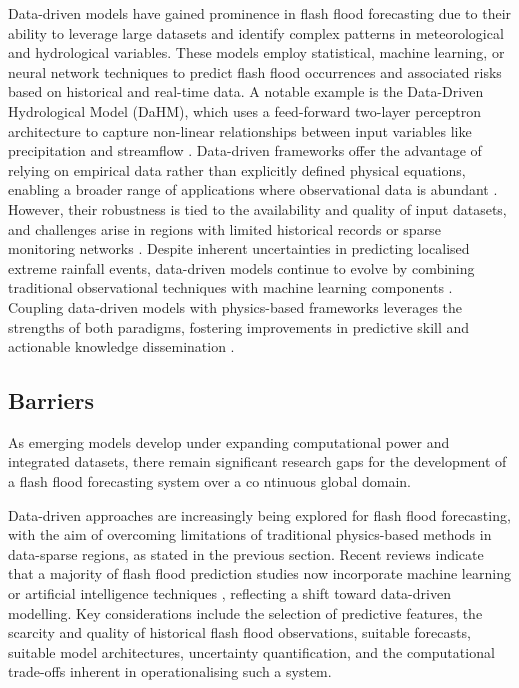 Data-driven models have gained prominence in flash flood forecasting due to their ability to leverage large datasets and identify complex patterns in meteorological and hydrological variables. These models employ statistical, machine learning, or neural network techniques to predict flash flood occurrences and associated risks based on historical and real-time data. A notable example is the Data-Driven Hydrological Model (DaHM), which uses a feed-forward two-layer perceptron architecture to capture non-linear relationships between input variables like precipitation and streamflow \citep{Philipp2016}. Data-driven frameworks offer the advantage of relying on empirical data rather than explicitly defined physical equations, enabling a broader range of applications where observational data is abundant \citep{Zanchetta2020, Msigwa2024}. However, their robustness is tied to the availability and quality of input datasets, and challenges arise in regions with limited historical records or sparse monitoring networks \citep{Zanchetta2020, Lu2021}. Despite inherent uncertainties in predicting localised extreme rainfall events, data-driven models continue to evolve by combining traditional observational techniques with machine learning components \citep{AlRawas2024}. Coupling data-driven models with physics-based frameworks leverages the strengths of both paradigms, fostering improvements in predictive skill and actionable knowledge dissemination \citep{Msigwa2024}. 

\subsection{Barriers}

As emerging models develop under expanding computational power and integrated datasets, there remain significant research gaps for the development of a flash flood forecasting system over a co ntinuous global domain. 

Data-driven approaches are increasingly being explored for flash flood forecasting, with the aim of overcoming limitations of traditional physics-based methods in data-sparse regions, as stated in the previous section. Recent reviews indicate that a majority of flash flood prediction studies now incorporate machine learning or artificial intelligence techniques \citep{AlRawas2024}, reflecting a shift toward data-driven modelling. Key considerations include the selection of predictive features, the scarcity and quality of historical flash flood observations, suitable forecasts, suitable model architectures, uncertainty quantification, and the computational trade-offs inherent in operationalising such a system.

